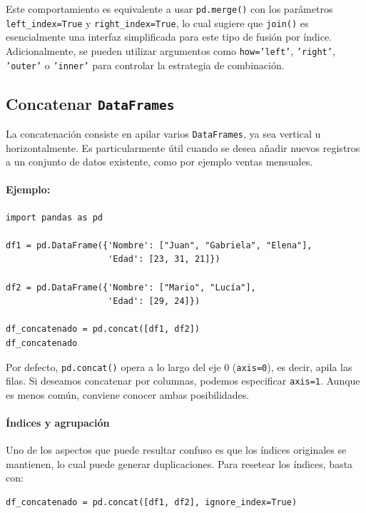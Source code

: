 \documentclass{article}
\theoremstyle{nonumberplain}
\begin{document}
Este comportamiento es equivalente a usar \texttt{pd.merge()} con los parámetros \texttt{left\_index=True} y \texttt{right\_index=True}, lo cual sugiere que \texttt{join()} es esencialmente una interfaz simplificada para este tipo de fusión por índice. Adicionalmente, se pueden utilizar argumentos como \texttt{how='left'}, \texttt{'right'}, \texttt{'outer'} o \texttt{'inner'} para controlar la estrategia de combinación.

\subsection*{Concatenar \texttt{DataFrames}}

La concatenación consiste en apilar varios \texttt{DataFrames}, ya sea vertical u horizontalmente. Es particularmente útil cuando se desea añadir nuevos registros a un conjunto de datos existente, como por ejemplo ventas mensuales.

\paragraph{Ejemplo:}

\begin{verbatim}
import pandas as pd

df1 = pd.DataFrame({'Nombre': ["Juan", "Gabriela", "Elena"],
                    'Edad': [23, 31, 21]})

df2 = pd.DataFrame({'Nombre': ["Mario", "Lucía"],
                    'Edad': [29, 24]})

df_concatenado = pd.concat([df1, df2])
df_concatenado
\end{verbatim}

Por defecto, \texttt{pd.concat()} opera a lo largo del eje 0 (\texttt{axis=0}), es decir, apila las filas. Si deseamos concatenar por columnas, podemos especificar \texttt{axis=1}. Aunque es menos común, conviene conocer ambas posibilidades.

\paragraph{Índices y agrupación}

Uno de los aspectos que puede resultar confuso es que los índices originales se mantienen, lo cual puede generar duplicaciones. Para resetear los índices, basta con:

\begin{verbatim}
df_concatenado = pd.concat([df1, df2], ignore_index=True)
\end{verbatim}
\end{document}

